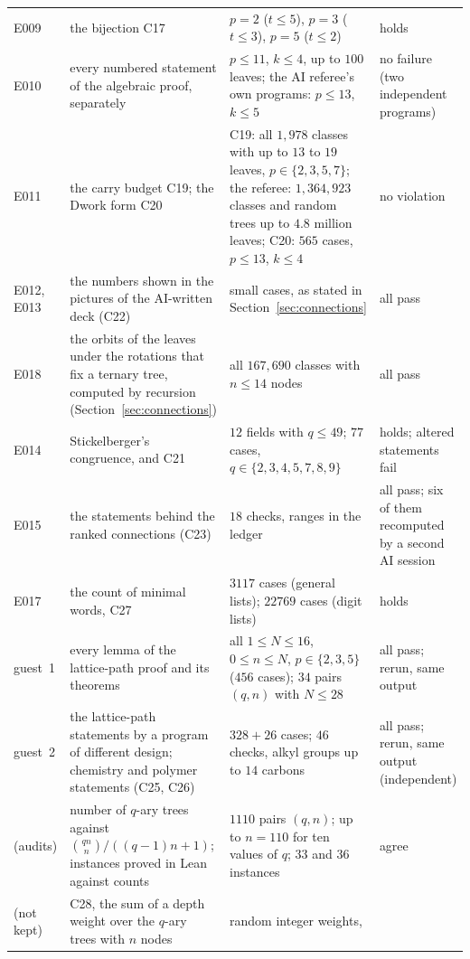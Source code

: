 \documentclass[11pt]{article}
\theoremstyle{definition}
\theoremstyle{remark}
\numberwithin{equation}{section}
\numberwithin{figure}{section}
\begin{document}
{\begin{longtable}{@{}>{\raggedright\arraybackslash}p{}>{\raggedright\arraybackslash}p{}>{\raggedright\arraybackslash}p{}>{\raggedright\arraybackslash}p{}@{}}
E009 & the bijection C17 & $p=2$ ($t\le5$), $p=3$ ($t\le3$), $p=5$ ($t\le2$) & holds\\\addlinespace[3pt]
E010 & every numbered statement of the algebraic proof, separately & $p\le11$, $k\le4$, up to $100$ leaves;
 the AI referee's own programs: $p\le13$, $k\le5$ & no failure (two independent programs)\\\addlinespace[3pt]
E011 & the carry budget C19; the Dwork form C20 & C19: all $1{,}978$ classes with up to $13$ to $19$
 leaves, $p\in\{2,3,5,7\}$; the referee: $1{,}364{,}923$ classes and random trees up to $4.8$ million leaves;
 C20: $565$ cases, $p\le13$, $k\le4$ & no violation\\\addlinespace[3pt]
E012, E013 & the numbers shown in the pictures of the AI-written deck (C22) & small cases, as stated in
 Section~\ref{sec:connections} & all pass\\\addlinespace[3pt]
E018 & the orbits of the leaves under the rotations that fix a ternary tree, computed by recursion
 (Section~\ref{sec:connections}) & all $167{,}690$ classes with $n\le14$ nodes & all pass\\\addlinespace[3pt]
E014 & Stickelberger's congruence, and C21 & $12$ fields with $q\le49$; $77$ cases,
 $q\in\{2,3,4,5,7,8,9\}$ & holds; altered statements fail\\\addlinespace[3pt]
E015 & the statements behind the ranked connections (C23) & $18$ checks, ranges in the ledger & all pass; six
 of them recomputed by a second AI session\\\addlinespace[3pt]
E017 & the count of minimal words, C27 & $3117$ cases (general lists); $22769$ cases (digit lists) & holds\\\addlinespace[3pt]
guest~1 & every lemma of the lattice-path proof and its theorems & all $1\le N\le16$, $0\le n\le N$,
 $p\in\{2,3,5\}$ ($456$ cases); $34$ pairs $(q,n)$ with $N\le28$ & all pass; rerun, same output\\\addlinespace[3pt]
guest~2 & the lattice-path statements by a program of different design; chemistry and polymer statements
 (C25, C26) & $328+26$ cases; $46$ checks, alkyl groups up to $14$ carbons & all pass; rerun, same output
 (independent)\\\addlinespace[3pt]
(audits) & number of $q$-ary trees against $\binom{qn}{n}/((q-1)n+1)$; instances proved in Lean against
 counts & $1110$ pairs $(q,n)$; up to $n=110$ for ten values of $q$; $33$ and $36$ instances & agree\\\addlinespace[3pt]
(not kept) & C28, the sum of a depth weight over the $q$-ary trees with $n$ nodes & random integer weights,

\end{longtable}}
\end{document}
